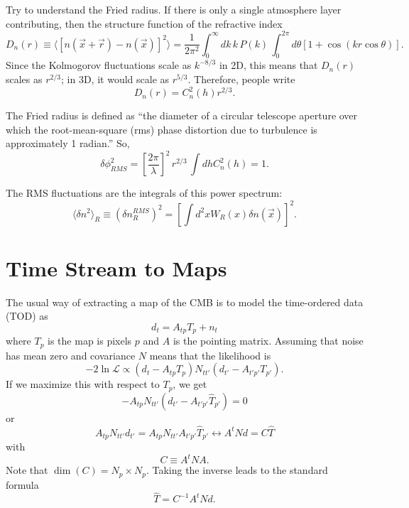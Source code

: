 \documentclass[12pt]{article}
\newcommand\be{\begin{equation}}
\newcommand\ee{\end{equation}}
\begin{document}
Try to understand the Fried radius. If there is only a single atmosphere layer contributing, then the structure function of the refractive index
\be
D_n(r) \equiv \langle [n(\vec x + \vec r) - n(\vec x)]^2\rangle = \frac{1}{2\pi^2} \int_0^\infty dk\,k\,P(k)\,\int_0^{2\pi} d\theta \left[ 1 + \cos(kr\cos\theta)\right].\ee
Since the Kolmogorov fluctuations scale as $k^{-8/3}$ in 2D, this means that $D_n(r)$ scales as $r^{2/3}$; in 3D, it would scale as $r^{5/3}$. 
Therefore, people write
\be
D_n(r) = C_n^2(h) r^{2/3}.\ee

The Fried radius is defined as ``the diameter of a circular telescope aperture over which the root-mean-square (rms) phase distortion due to turbulence is approximately 1 radian.'' So,
\be
\delta\phi_{RMS}^2 = \left[\frac{2\pi}{\lambda}\right]^2\,r^{2/3}\,\int dh C_n^2(h)= 1.
\ee

The RMS fluctuations are the integrals of this power spectrum:
\be
\langle \delta n^2 \rangle_R \equiv (\delta n^{RMS}_R)^2 = [\int d^2x W_R(x) \delta n(\vec x)]^2.\ee
%
%
%

\section{Time Stream to Maps}

The usual way of extracting a map of the CMB is to model the time-ordered data (TOD) as
\be
d_t = A_{tp} T_p + n_t\ee
where $T_p$ is the map is pixels $p$ and $A$ is the pointing matrix. Assuming that noise has mean zero and covariance $N$ means that the likelihood is
\be
-2\ln\mathcal{L} \propto (d_t-A_{tp} T_p) N_{tt'} (d_{t'}-A_{t'p'} T_{p'}).
\ee
If we maximize this with respect to $T_p$, we get
\be -A_{tp} N_{tt'} (d_{t'}-A_{t'p'} \hat T_{p'}) = 0\ee
or
\be A_{tp} N_{tt'} d_{t'} = A_{tp} N_{tt'}A_{t'p'} \hat T_{p'}
\leftrightarrow
A^tNd = C \hat T
\ee
with
\be
C\equiv A^tN A.\ee
Note that $\dim(C)=N_p\times N_p$.
Taking the inverse leads to the standard formula
\be
\hat T = C^{-1} A^t N d.\ee
\end{document}
